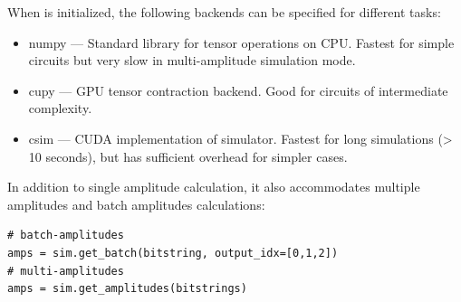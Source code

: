 When  is initialized, the following backends can be specified for different tasks:
\begin{itemize}
    \item numpy --- Standard library for tensor operations on CPU. Fastest for simple circuits but very slow in multi-amplitude simulation mode.
    \item cupy --- GPU tensor contraction backend. Good for circuits of intermediate complexity.
    \item csim --- CUDA implementation of simulator. Fastest for long simulations (> 10 seconds), but has sufficient overhead for simpler cases.
\end{itemize}

In addition to single amplitude calculation, it also accommodates multiple amplitudes and batch amplitudes calculations:
\begin{lstlisting}
# batch-amplitudes
amps = sim.get_batch(bitstring, output_idx=[0,1,2])
# multi-amplitudes
amps = sim.get_amplitudes(bitstrings)
\end{lstlisting}

